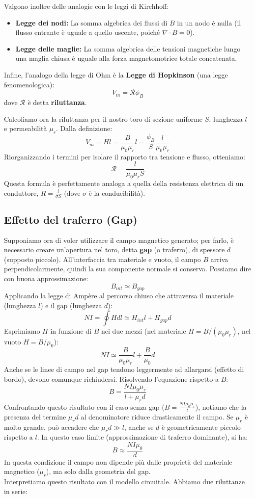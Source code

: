 \documentclass{book}
\begin{document}
Valgono inoltre delle analogie con le leggi di Kirchhoff:
\begin{itemize}
  \item \textbf{Legge dei nodi:} La somma algebrica dei flussi di $B$ in un nodo è nulla (il flusso entrante è uguale a quello uscente, poiché $\nabla \cdot B = 0$).
  \item \textbf{Legge delle maglie:} La somma algebrica delle tensioni magnetiche lungo una maglia chiusa è uguale alla forza magnetomotrice totale concatenata.
\end{itemize}

Infine, l'analogo della legge di Ohm è la \textbf{Legge di Hopkinson} (una legge fenomenologica):
$$
V_m = \mathcal{R} \phi_B
$$
dove $\mathcal{R}$ è detta \textbf{riluttanza}.

Calcoliamo ora la riluttanza per il nostro toro di sezione uniforme $S$, lunghezza $l$ e permeabilità $\mu_r$. Dalla definizione:
$$
V_m = Hl = \frac{B}{\mu_0 \mu_r }l = \frac{\phi_B}{S} \frac{ l}{\mu_0 \mu_r }
$$
Riorganizzando i termini per isolare il rapporto tra tensione e flusso, otteniamo:
$$
\mathcal{R}=\frac{ l}{\mu_0 \mu_r S}
$$
Questa formula è perfettamente analoga a quella della resistenza elettrica di un conduttore, $R = \frac{l}{\sigma S}$ (dove $\sigma$ è la conducibilità).

\subsection{Effetto del traferro (Gap)}

Supponiamo ora di voler utilizzare il campo magnetico generato; per farlo, è necessario creare un'apertura nel toro, detta \textbf{gap} (o traferro), di spessore $d$ (supposto piccolo).
All'interfaccia tra materiale e vuoto, il campo $B$ arriva perpendicolarmente, quindi la sua componente normale si conserva. Possiamo dire con buona approssimazione:
$$
B_{int} \simeq B_{gap}
$$
Applicando la legge di Ampère al percorso chiuso che attraversa il materiale (lunghezza $l$) e il gap (lunghezza $d$):
$$
NI = \oint H dl \simeq H_{int} l + H_{gap} d
$$
Esprimiamo $H$ in funzione di $B$ nei due mezzi (nel materiale $H=B/(\mu_0\mu_r)$, nel vuoto $H=B/\mu_0$):
$$
NI \simeq \frac{ B}{\mu_0 \mu_r} l + \frac{B}{\mu_0} d
$$
Anche se le linee di campo nel gap tendono leggermente ad allargarsi (effetto di bordo), devono comunque richiudersi. Risolvendo l'equazione rispetto a $B$:
$$
B = \frac{NI \mu_0 \mu_r }{l+ \mu_r d}
$$
Confrontando questo risultato con il caso senza gap ($B = \frac{NI\mu_0 \mu_r }{l}$), notiamo che la presenza del termine $\mu_r d$ al denominatore riduce drasticamente il campo.
Se $\mu_r$ è molto grande, può accadere che $\mu_r d \gg l$, anche se $d$ è geometricamente piccolo rispetto a $l$. In questo caso limite (approssimazione di traferro dominante), si ha:
$$
B \approx \frac{NI \mu_0}{d}
$$
In questa condizione il campo non dipende più dalle proprietà del materiale magnetico ($\mu_r$), ma solo dalla geometria del gap.
\\
Interpretiamo questo risultato con il modello circuitale. Abbiamo due riluttanze in serie:
\end{document}
